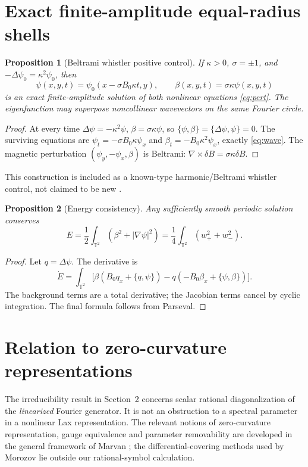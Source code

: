 \documentclass[11pt,a4paper]{article}
\newtheorem{proposition}{Proposition}
\begin{document}
\section{Exact finite-amplitude equal-radius shells}
\begin{proposition}[Beltrami whistler positive control]\label{prop:wave}
If \(\kappa>0\), \(\sigma=\pm1\), and
\(-\Delta\psi_0=\kappa^2\psi_0\), then
\begin{equation}\label{eq:wave}
 \psi(x,y,t)=\psi_0(x-\sigma B_0\kappa t,y),\qquad
 \beta(x,y,t)=\sigma\kappa\psi(x,y,t)
\end{equation}
is an exact finite-amplitude solution of both nonlinear equations \eqref{eq:pert}. The eigenfunction may superpose noncollinear wavevectors on the same Fourier circle.
\end{proposition}
\begin{proof}
At every time \(\Delta\psi=-\kappa^2\psi\), \(\beta=\sigma\kappa\psi\), so \(\{\psi,\beta\}=\{\Delta\psi,\psi\}=0\). The surviving equations are
\(\psi_t=-\sigma B_0\kappa\psi_x\) and
\(\beta_t=-B_0\kappa^2\psi_x\), exactly \eqref{eq:wave}. The magnetic perturbation \((\psi_y,-\psi_x,\beta)\) is Beltrami:
\(\nabla\times\delta B=\sigma\kappa\delta B\).
\end{proof}
This construction is included as a known-type harmonic/Beltrami whistler control, not claimed to be new \cite{lyutikov}.
\begin{proposition}[Energy consistency]
Any sufficiently smooth periodic solution conserves
\[
 E=\frac12\int_{\mathbb T^2}(\beta^2+|\nabla\psi|^2)
 =\frac14\int_{\mathbb T^2}(w_+^2+w_-^2).
\]
\end{proposition}
\begin{proof}
Let \(q=\Delta\psi\). The derivative is
\[
 \dot E=\int_{\mathbb T^2}\bigl[
 \beta(B_0q_x+\{q,\psi\})-q(-B_0\beta_x+\{\psi,\beta\})\bigr].
\]
The background terms are a total derivative; the Jacobian terms cancel by cyclic integration. The final formula follows from Parseval.
\end{proof}

\section{Relation to zero-curvature representations}
The irreducibility result in Section~2 concerns scalar rational diagonalization
of the \emph{linearized} Fourier generator. It is not an obstruction
to a spectral parameter in a nonlinear Lax representation. The relevant
notions of zero-curvature representation, gauge equivalence and parameter
removability are developed in the general framework of Marvan
\cite{marvan1993,marvan2002}; the differential-covering methods used by
Morozov \cite{morozov} lie outside our rational-symbol calculation.
\end{document}
